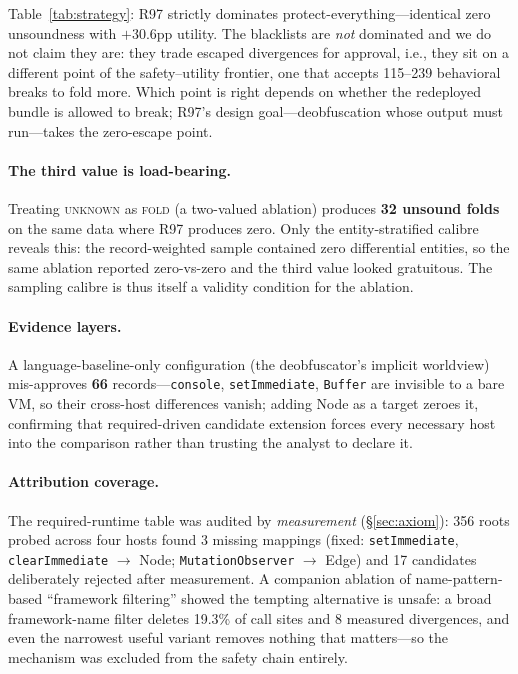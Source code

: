 \documentclass[sigconf,nonacm]{acmart}
\begin{document}
Table~\ref{tab:strategy}: R97 strictly dominates protect-everything---identical zero unsoundness with $+$30.6pp utility. The blacklists are \emph{not} dominated and we do not claim they are: they trade escaped divergences for approval, i.e., they sit on a different point of the safety--utility frontier, one that accepts 115--239 behavioral breaks to fold more. Which point is right depends on whether the redeployed bundle is allowed to break; R97's design goal---deobfuscation whose output must run---takes the zero-escape point.

\paragraph{The third value is load-bearing.} Treating \textsc{unknown} as \textsc{fold} (a two-valued ablation) produces \textbf{32 unsound folds} on the same data where R97 produces zero. Only the entity-stratified calibre reveals this: the record-weighted sample contained zero differential entities, so the same ablation reported zero-vs-zero and the third value looked gratuitous. The sampling calibre is thus itself a validity condition for the ablation.

\paragraph{Evidence layers.} A language-baseline-only configuration (the deobfuscator's implicit worldview) mis-approves \textbf{66} records---\texttt{console}, \texttt{setImmediate}, \texttt{Buffer} are invisible to a bare VM, so their cross-host differences vanish; adding Node as a target zeroes it, confirming that required-driven candidate extension forces every necessary host into the comparison rather than trusting the analyst to declare it.

\paragraph{Attribution coverage.} The required-runtime table was audited by \emph{measurement} (\S\ref{sec:axiom}): 356 roots probed across four hosts found 3 missing mappings (fixed: \texttt{setImmediate}, \texttt{clearImmediate} $\to$ Node; \texttt{MutationObserver} $\to$ Edge) and 17 candidates deliberately rejected after measurement. A companion ablation of name-pattern-based ``framework filtering'' showed the tempting alternative is unsafe: a broad framework-name filter deletes 19.3\% of call sites and 8 measured divergences, and even the narrowest useful variant removes nothing that matters---so the mechanism was excluded from the safety chain entirely.
\end{document}
